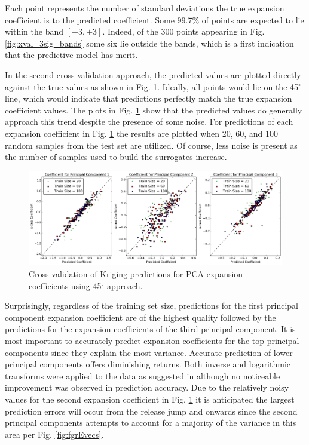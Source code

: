 Each point represents the number of standard deviations the true expansion coefficient is to the predicted coefficient. Some 99.7\% of points are expected to lie within the band $\left[-3, +3\right]$. Indeed, of the 300 points appearing in Fig. \ref{fig:xval_3sig_bands} some six lie outside the bands, which is a first indication that the predictive model has merit.  

In the second cross validation approach, the predicted values are plotted directly against the true values as shown in Fig. \ref{fig:xval_45degree}. Ideally, all points would lie on the 45$^{\circ}$ line, which would indicate that predictions perfectly match the true expansion coefficient values. The plots in Fig. \ref{fig:xval_45degree} show that the predicted values do generally approach this trend despite the presence of some noise. For predictions of each expansion coefficient in Fig. \ref{fig:xval_45degree} the results are plotted when 20, 60, and 100 random samples from the test set are utilized. Of course, less noise is present as the number of samples used to build the surrogates increase.  
\begin{figure}
\caption{\label{fig:xval_45degree}
Cross validation of Kriging predictions for \ac{PCA} expansion coefficients using 45$^\circ$ approach.}
 \begin{center}
  \includegraphics[scale=.4]{./Chapter4/xval_45degree.pdf}
 \end{center}
\end{figure}
Surprisingly, regardless of the training set size, predictions for the first principal component expansion coefficient are of the highest quality followed by the predictions for the expansion coefficients of the third principal component. It is most important to accurately predict expansion coefficients for the top principal components since they explain the most variance. Accurate prediction of lower principal components offers diminishing returns. Both inverse and logarithmic transforms were applied to the data as suggested in \cite{Jones_Schonlau} although no noticeable improvement was observed in prediction accuracy. Due to the relatively noisy values for the second expansion coefficient in Fig. \ref{fig:xval_45degree} it is anticipated the largest prediction errors will occur from the release jump and onwards since the second principal components attempts to account for a majority of the variance in this area per Fig. \ref{fig:fgrEvecs}.

